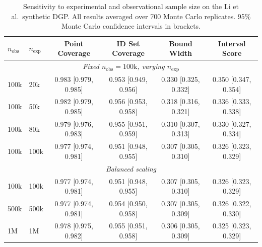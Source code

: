 \documentclass[accepted]{uai2026} %
\theoremstyle{plain}
\theoremstyle{definition}
\theoremstyle{remark}
\begin{document}
\begin{table}[htbp]
\centering
\caption{Sensitivity to experimental and observational sample size on the Li et al.\ synthetic DGP. All results averaged over 700 Monte Carlo replicates. 95\% Monte Carlo confidence intervals in brackets.}
\label{tab:sensitivity}
\small
\begin{tabular}{llcccc}
\toprule
$n_\mathrm{obs}$ & $n_\mathrm{exp}$ & Point Coverage & ID Set Coverage & Bound Width & Interval Score \\
\midrule
\multicolumn{6}{c}{\textit{Fixed $n_\mathrm{obs} = 100\mathrm{k}$, varying $n_\mathrm{exp}$}} \\
100k & 20k  & 0.983 {\scriptsize [0.979, 0.985]} & 0.953 {\scriptsize [0.949, 0.956]} & 0.330 {\scriptsize [0.325, 0.332]} & 0.350 {\scriptsize [0.347, 0.354]} \\
100k & 50k  & 0.982 {\scriptsize [0.979, 0.985]} & 0.956 {\scriptsize [0.953, 0.958]} & 0.318 {\scriptsize [0.316, 0.321]} & 0.336 {\scriptsize [0.333, 0.338]} \\
100k & 80k  & 0.979 {\scriptsize [0.976, 0.983]} & 0.955 {\scriptsize [0.951, 0.959]} & 0.310 {\scriptsize [0.307, 0.313]} & 0.330 {\scriptsize [0.327, 0.334]} \\
100k & 100k & 0.977 {\scriptsize [0.974, 0.981]} & 0.951 {\scriptsize [0.948, 0.955]} & 0.307 {\scriptsize [0.305, 0.310]} & 0.326 {\scriptsize [0.323, 0.329]} \\
\midrule
\multicolumn{6}{c}{\textit{Balanced scaling}} \\
100k  & 100k  & 0.977 {\scriptsize [0.974, 0.981]} & 0.951 {\scriptsize [0.948, 0.955]} & 0.307 {\scriptsize [0.305, 0.310]} & 0.326 {\scriptsize [0.323, 0.329]} \\
500k  & 500k  & 0.977 {\scriptsize [0.974, 0.981]} & 0.954 {\scriptsize [0.950, 0.958]} & 0.307 {\scriptsize [0.305, 0.309]} & 0.326 {\scriptsize [0.322, 0.330]} \\
1M    & 1M    & 0.978 {\scriptsize [0.975, 0.982]} & 0.955 {\scriptsize [0.951, 0.958]} & 0.306 {\scriptsize [0.305, 0.309]} & 0.325 {\scriptsize [0.323, 0.329]} \\
\bottomrule
\end{tabular}
\end{table}
\end{document}
